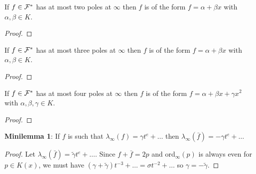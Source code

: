 \documentclass[english,11pt,a4paper]{article}
\begin{document}
\begin{lemma}
	If $f \in \mathcal{F}^*$ has at most two poles at $\infty$ then $f$ is of the form $f = \alpha + \beta x$ with $\alpha, \beta \in K$.
	\begin{proof}
	
	\end{proof}
\end{lemma}

\begin{lemma}
	If $f \in \mathcal{F}^*$ has at most three poles at $\infty$ then $f$ is of the form $f = \alpha + \beta x$ with $\alpha, \beta \in K$.
	\begin{proof}
	
	\end{proof}
\end{lemma}

\begin{lemma}
	If $f \in \mathcal{F}^*$ has at most four poles at $\infty$ then $f$ is of the form $f = \alpha + \beta x + \gamma x^2$ with $\alpha, \beta, \gamma \in K$.
	\begin{proof}
	
	\end{proof}
\end{lemma}










\fline

\textbf{Minilemma 1}: If $f$ is such that $\lambda_\infty (f)=\gamma t^e + \dots$ then $\lambda_\infty (\bar f)=-\gamma t^e + \dots$

\begin{proof}
	Let $\lambda_\infty (\bar f) = \tilde \gamma t^e + \dots$. Since $f + \bar f = 2p$ and ord$_\infty(p)$ is always even for $p \in K(x)$, we must have $(\gamma + \tilde \gamma)t^{-3} + \dots = \sigma t^{-2} + \dots$ so $\gamma = - \tilde \gamma$.
\end{proof}
\end{document}
